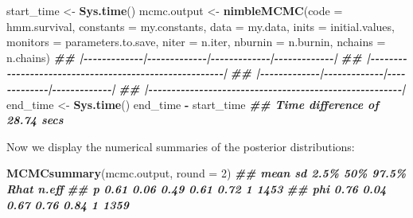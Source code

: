 \documentclass[
  12pt,
]{krantz}
\newenvironment{Shaded}{\begin{snugshade}}{\end{snugshade}}
\newcommand{\AttributeTok}[1]{\textcolor[rgb]{0.13,0.29,0.53}{#1}}
\newcommand{\DecValTok}[1]{\textcolor[rgb]{0.00,0.00,0.81}{#1}}
\newcommand{\DocumentationTok}[1]{\textcolor[rgb]{0.56,0.35,0.01}{\textbf{\textit{#1}}}}
\newcommand{\FunctionTok}[1]{\textcolor[rgb]{0.13,0.29,0.53}{\textbf{#1}}}
\newcommand{\NormalTok}[1]{#1}
\newcommand{\OtherTok}[1]{\textcolor[rgb]{0.56,0.35,0.01}{#1}}
\newcommand{\SpecialCharTok}[1]{\textcolor[rgb]{0.81,0.36,0.00}{\textbf{#1}}}
\begin{document}
\begin{Shaded}
\begin{Highlighting}[]
\NormalTok{start\_time }\OtherTok{\textless{}{-}} \FunctionTok{Sys.time}\NormalTok{()}
\NormalTok{mcmc.output }\OtherTok{\textless{}{-}} \FunctionTok{nimbleMCMC}\NormalTok{(}\AttributeTok{code =}\NormalTok{ hmm.survival,}
                          \AttributeTok{constants =}\NormalTok{ my.constants,}
                          \AttributeTok{data =}\NormalTok{ my.data,}
                          \AttributeTok{inits =}\NormalTok{ initial.values,}
                          \AttributeTok{monitors =}\NormalTok{ parameters.to.save,}
                          \AttributeTok{niter =}\NormalTok{ n.iter,}
                          \AttributeTok{nburnin =}\NormalTok{ n.burnin,}
                          \AttributeTok{nchains =}\NormalTok{ n.chains)}
\DocumentationTok{\#\# |{-}{-}{-}{-}{-}{-}{-}{-}{-}{-}{-}{-}{-}|{-}{-}{-}{-}{-}{-}{-}{-}{-}{-}{-}{-}{-}|{-}{-}{-}{-}{-}{-}{-}{-}{-}{-}{-}{-}{-}|{-}{-}{-}{-}{-}{-}{-}{-}{-}{-}{-}{-}{-}|}
\DocumentationTok{\#\# |{-}{-}{-}{-}{-}{-}{-}{-}{-}{-}{-}{-}{-}{-}{-}{-}{-}{-}{-}{-}{-}{-}{-}{-}{-}{-}{-}{-}{-}{-}{-}{-}{-}{-}{-}{-}{-}{-}{-}{-}{-}{-}{-}{-}{-}{-}{-}{-}{-}{-}{-}{-}{-}{-}{-}|}
\DocumentationTok{\#\# |{-}{-}{-}{-}{-}{-}{-}{-}{-}{-}{-}{-}{-}|{-}{-}{-}{-}{-}{-}{-}{-}{-}{-}{-}{-}{-}|{-}{-}{-}{-}{-}{-}{-}{-}{-}{-}{-}{-}{-}|{-}{-}{-}{-}{-}{-}{-}{-}{-}{-}{-}{-}{-}|}
\DocumentationTok{\#\# |{-}{-}{-}{-}{-}{-}{-}{-}{-}{-}{-}{-}{-}{-}{-}{-}{-}{-}{-}{-}{-}{-}{-}{-}{-}{-}{-}{-}{-}{-}{-}{-}{-}{-}{-}{-}{-}{-}{-}{-}{-}{-}{-}{-}{-}{-}{-}{-}{-}{-}{-}{-}{-}{-}{-}|}
\NormalTok{end\_time }\OtherTok{\textless{}{-}} \FunctionTok{Sys.time}\NormalTok{()}
\NormalTok{end\_time }\SpecialCharTok{{-}}\NormalTok{ start\_time}
\DocumentationTok{\#\# Time difference of 28.74 secs}
\end{Highlighting}
\end{Shaded}

Now we display the numerical summaries of the posterior distributions:

\begin{Shaded}
\begin{Highlighting}[]
\FunctionTok{MCMCsummary}\NormalTok{(mcmc.output, }\AttributeTok{round =} \DecValTok{2}\NormalTok{)}
\DocumentationTok{\#\#     mean   sd 2.5\%  50\% 97.5\% Rhat n.eff}
\DocumentationTok{\#\# p   0.61 0.06 0.49 0.61  0.72    1  1453}
\DocumentationTok{\#\# phi 0.76 0.04 0.67 0.76  0.84    1  1359}
\end{Highlighting}
\end{Shaded}
\end{document}
